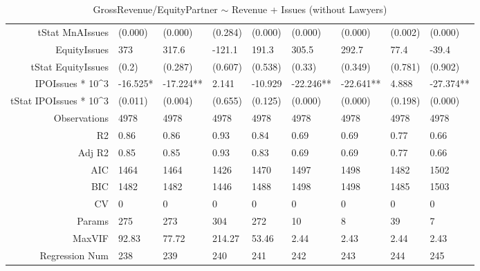 \begin{table}[ht]
\begin{tabular}{rllllllll}
  tStat MnAIssues & (0.000) & (0.000) & (0.284) & (0.000) & (0.000) & (0.000) & (0.002) & (0.000) \\ 
  EquityIssues & 373 & 317.6 & -121.1 & 191.3 & 305.5 & 292.7 & 77.4 & -39.4 \\ 
  tStat EquityIssues & (0.2) & (0.287) & (0.607) & (0.538) & (0.33) & (0.349) & (0.781) & (0.902) \\ 
  IPOIssues * 10^3 & -16.525* & -17.224** & 2.141 & -10.929 & -22.246** & -22.641** & 4.888 & -27.374** \\ 
  tStat IPOIssues * 10^3 & (0.011) & (0.004) & (0.655) & (0.125) & (0.000) & (0.000) & (0.198) & (0.000) \\ 
  Observations & 4978 & 4978 & 4978 & 4978 & 4978 & 4978 & 4978 & 4978 \\ 
  R2 & 0.86 & 0.86 & 0.93 & 0.84 & 0.69 & 0.69 & 0.77 & 0.66 \\ 
  Adj R2 & 0.85 & 0.85 & 0.93 & 0.83 & 0.69 & 0.69 & 0.77 & 0.66 \\ 
  AIC & 1464 & 1464 & 1426 & 1470 & 1497 & 1498 & 1482 & 1502 \\ 
  BIC & 1482 & 1482 & 1446 & 1488 & 1498 & 1498 & 1485 & 1503 \\ 
  CV & 0 & 0 & 0 & 0 & 0 & 0 & 0 & 0 \\ 
  Params & 275 & 273 & 304 & 272 & 10 & 8 & 39 & 7 \\ 
  MaxVIF & 92.83 & 77.72 & 214.27 & 53.46 & 2.44 & 2.43 & 2.44 & 2.43 \\ 
  Regression Num & 238 & 239 & 240 & 241 & 242 & 243 & 244 & 245 \\ 
   \hline
\end{tabular}
\caption{GrossRevenue/EquityPartner $\sim$ Revenue + Issues (without Lawyers)} 
\end{table}
